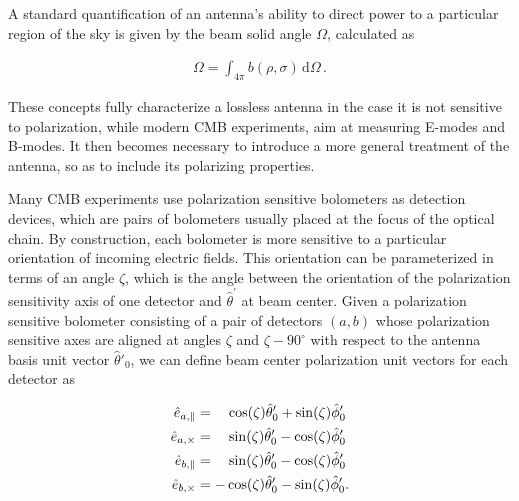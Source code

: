 \documentclass[a4paper,11pt]{article}
\newcommand{\co}{\mathbin{\|}}
\newcommand{\cx}{\mathbin{\times}}
\begin{document}
\noindent
A standard quantification of an antenna's ability to direct power to a particular region of the sky is given by the beam solid angle $\Omega$, calculated as

\begin{equation}
\begin{aligned}
\Omega = \int_{4\pi} b(\rho,\sigma) \, \mathrm{d} \Omega \, .
\end{aligned}
\label{eq::omega_def}
\end{equation}

\noindent
These concepts fully characterize a lossless antenna in the case it is not sensitive to polarization, while modern CMB experiments, aim at measuring E-modes and B-modes. It then becomes necessary to introduce a more general treatment of the antenna, so as to include its polarizing properties. 

Many CMB experiments use polarization sensitive bolometers as detection devices, which are pairs of bolometers usually placed at the focus of the optical chain. By construction, each bolometer is more sensitive to a particular orientation of incoming electric fields. This orientation can be parameterized in terms of an angle $\zeta$, which is the angle between the orientation of the polarization sensitivity axis of one detector and $\hat{\theta}^{\prime}$ at beam center. Given a polarization sensitive bolometer consisting of a pair of detectors $(a,b)$ whose polarization sensitive axes are aligned at angles $\zeta$ and $\zeta - 90^{\circ}$ with respect to the antenna basis unit vector $\hat{\theta}'_0$, we can define beam center polarization unit vectors for each detector as

\begin{align}
\hat{e}_{a,{\co}}    &= \quad \cos(\zeta)\hat{\theta}'_0 + \sin(\zeta)\hat{\phi}'_0 \\
\hat{e}_{a,{\cx}}    &= \quad \sin(\zeta)\hat{\theta}'_0 - \cos(\zeta)\hat{\phi}'_0 \\
\hat{e}_{b,{\co}}    &= \quad \sin(\zeta)\hat{\theta}'_0 - \cos(\zeta)\hat{\phi}'_0 \\
\hat{e}_{b,{\cx}}    &= -\cos(\zeta)\hat{\theta}'_0 - \sin(\zeta)\hat{\phi}'_0 \rm{.} \\
\label{eq::copol_bolo}
\end{align}

\end{document}
